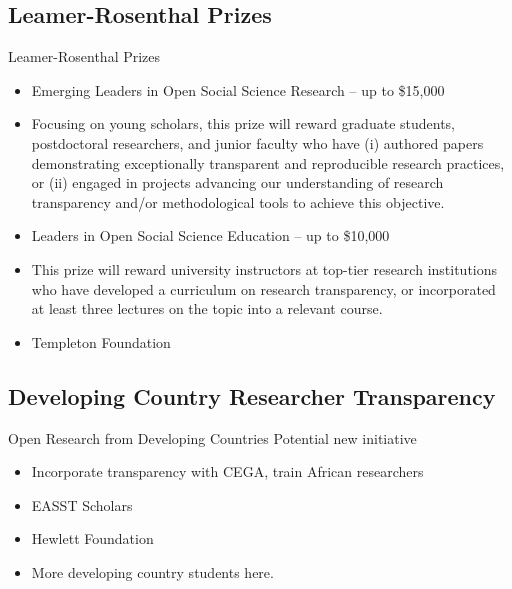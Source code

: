 \documentclass{beamer}
\begin{document}
\subsection{Leamer-Rosenthal Prizes}
\begin{frame}{Leamer-Rosenthal Prizes}

\begin{itemize}
\item Emerging Leaders in Open Social Science Research – up to \$15,000
\href{http://www.bitss.org/prizes}{}

\item 
Focusing on young scholars, this prize will reward graduate students, postdoctoral researchers, and junior faculty who have (i) authored papers demonstrating exceptionally transparent and reproducible research practices, or (ii) engaged in projects advancing our understanding of research transparency and/or methodological tools to achieve this objective.

\item Leaders in Open Social Science Education – up to \$10,000

\item This prize will reward university instructors at top-tier research institutions who have developed a curriculum on research transparency, or incorporated at least three lectures on the topic into a relevant course. 

\item Templeton Foundation
\end{itemize}
\end{frame}

\subsection{Developing Country Researcher Transparency}
\begin{frame}{Open Research from Developing Countries}
Potential new initiative
\begin{itemize}
\item Incorporate transparency with CEGA, train African researchers
\item EASST Scholars
\item Hewlett Foundation
\item More developing country students here.
\end{itemize}


\end{frame}
\end{document}
